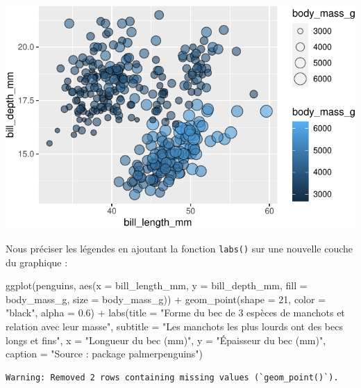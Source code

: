 \documentclass[
  a4paper,
  DIV=11,
  numbers=noendperiod,
  oneside]{scrreprt}
\newenvironment{Shaded}{}{}
\newcommand{\AttributeTok}[1]{\textcolor[rgb]{0.84,0.23,0.29}{#1}}
\newcommand{\DecValTok}[1]{\textcolor[rgb]{0.00,0.36,0.77}{#1}}
\newcommand{\FloatTok}[1]{\textcolor[rgb]{0.00,0.36,0.77}{#1}}
\newcommand{\FunctionTok}[1]{\textcolor[rgb]{0.44,0.26,0.76}{#1}}
\newcommand{\NormalTok}[1]{\textcolor[rgb]{0.14,0.16,0.18}{#1}}
\newcommand{\SpecialCharTok}[1]{\textcolor[rgb]{0.00,0.36,0.77}{#1}}
\newcommand{\StringTok}[1]{\textcolor[rgb]{0.01,0.18,0.38}{#1}}
\begin{document}
\includegraphics{03-visualization_files/figure-pdf/unnamed-chunk-87-1.pdf}

Nous préciser les légendes en ajoutant la fonction \texttt{labs()} sur
une nouvelle couche du graphique :

\begin{Shaded}
\begin{Highlighting}[]
\FunctionTok{ggplot}\NormalTok{(penguins, }\FunctionTok{aes}\NormalTok{(}\AttributeTok{x =}\NormalTok{ bill\_length\_mm, }\AttributeTok{y =}\NormalTok{ bill\_depth\_mm,}
                     \AttributeTok{fill =}\NormalTok{ body\_mass\_g, }\AttributeTok{size =}\NormalTok{ body\_mass\_g)) }\SpecialCharTok{+}
  \FunctionTok{geom\_point}\NormalTok{(}\AttributeTok{shape =} \DecValTok{21}\NormalTok{, }\AttributeTok{color =} \StringTok{"black"}\NormalTok{, }\AttributeTok{alpha =} \FloatTok{0.6}\NormalTok{) }\SpecialCharTok{+}
  \FunctionTok{labs}\NormalTok{(}\AttributeTok{title =} \StringTok{"Forme du bec de 3 espèces de manchots et relation avec leur masse"}\NormalTok{,}
       \AttributeTok{subtitle =} \StringTok{"Les manchots les plus lourds ont des becs longs et fins"}\NormalTok{,}
       \AttributeTok{x =} \StringTok{"Longueur du bec (mm)"}\NormalTok{,}
       \AttributeTok{y =} \StringTok{"Épaisseur du bec (mm)"}\NormalTok{,}
       \AttributeTok{caption =} \StringTok{"Source :  package \textquotesingle{}palmerpenguins\textquotesingle{}"}\NormalTok{)}
\end{Highlighting}
\end{Shaded}

\begin{verbatim}
Warning: Removed 2 rows containing missing values (`geom_point()`).
\end{verbatim}
\end{document}
